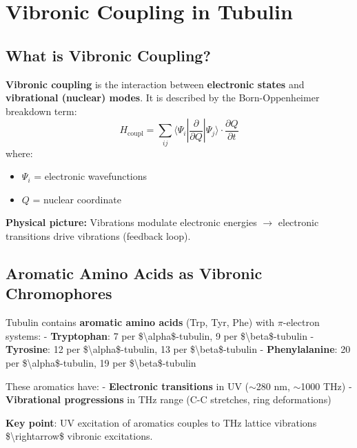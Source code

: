 \section{Vibronic Coupling in Tubulin}
\label{sec:vibronic-coupling}

\subsection{What is Vibronic Coupling?}
\label{subsec:vibronic-definition}

\textbf{Vibronic coupling} is the interaction between \textbf{electronic states} and \textbf{vibrational (nuclear) modes}. It is described by the Born-Oppenheimer breakdown term:
\begin{equation}
\label{eq:vibronic-coupling}
H_{\text{coupl}} = \sum_{ij} \langle \Psi_i | \frac{\partial}{\partial Q} | \Psi_j \rangle \cdot \frac{\partial Q}{\partial t}
\end{equation}
where:
\begin{itemize}
\item $\Psi_i$ = electronic wavefunctions
\item $Q$ = nuclear coordinate
\end{itemize}

\textbf{Physical picture:} Vibrations modulate electronic energies $\rightarrow$ electronic transitions drive vibrations (feedback loop).

\subsection{Aromatic Amino Acids as Vibronic Chromophores}\label{aromatic-amino-acids-as-vibronic-chromophores}

Tubulin contains \textbf{aromatic amino acids} (Trp, Tyr, Phe) with
\(\pi\)-electron systems: - \textbf{Tryptophan}: 7 per
\$\textbackslash alpha\$-tubulin, 9 per \$\textbackslash beta\$-tubulin
- \textbf{Tyrosine}: 12 per \$\textbackslash alpha\$-tubulin, 13 per
\$\textbackslash beta\$-tubulin - \textbf{Phenylalanine}: 20 per
\$\textbackslash alpha\$-tubulin, 19 per \$\textbackslash beta\$-tubulin

These aromatics have: - \textbf{Electronic transitions} in UV
($\sim$280 nm, $\sim$1000 THz) - \textbf{Vibrational
progressions} in THz range (C-C stretches, ring deformations)

\textbf{Key point}: UV excitation of aromatics couples to THz lattice
vibrations \$\textbackslash rightarrow\$ vibronic excitations.


